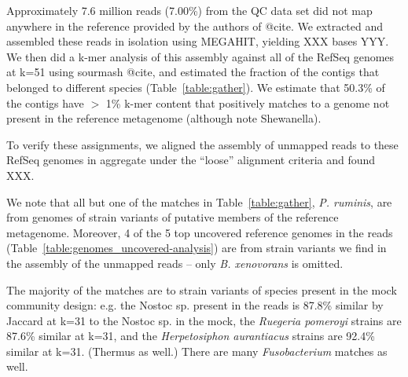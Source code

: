 \documentclass[10pt,a4paper,twocolumn]{article}
\begin{document}
Approximately 7.6 million reads (7.00\%) from the QC data set did not
map anywhere in the reference provided by the authors of @cite.  We
extracted and assembled these reads in isolation using MEGAHIT,
yielding XXX bases YYY.  We then did a k-mer analysis of this assembly
against all of the RefSeq genomes at k=51 using sourmash @cite, and
estimated the fraction of the contigs that belonged to different
species (Table~\ref{table:gather}). We estimate that 50.3\% of the
contigs have $>$ 1\% k-mer content that positively matches to a genome
not present in the reference metagenome (although note Shewanella).


To verify these assignments, we aligned the assembly of unmapped reads
to these RefSeq genomes in aggregate under the ``loose'' alignment
criteria and found XXX.

We note that all but one of the matches in Table~\ref{table:gather},
{\em P. ruminis}, are from genomes of strain variants of putative
members of the reference metagenome.  Moreover, 4 of the 5 top
uncovered reference genomes in the reads
(Table~\ref{table:genomes_uncovered-analysis}) are from strain
variants we find in the assembly of the unmapped reads -- only {\em
  B. xenovorans} is omitted.


The majority of the matches are to strain variants of species present
in the mock community design: e.g. the Nostoc sp. present in the reads
is 87.8\% similar by Jaccard at k=31 to the Nostoc sp. in the mock,
the {\em Ruegeria pomeroyi} strains are 87.6\% similar at k=31,
and the {\em Herpetosiphon aurantiacus} strains are 92.4\% similar
at k=31.  (Thermus as well.) There are many {\em Fusobacterium} matches as well.
\end{document}
